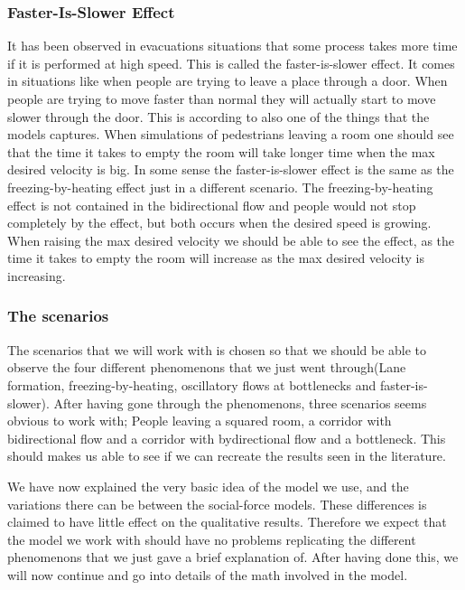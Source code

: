\subsubsection{Faster-Is-Slower Effect}
It has been observed in evacuations situations that some process takes more 
time if it is performed at high speed. This is called the faster-is-slower effect. It comes
in situations like when people are trying to leave a place through a door. When people are
trying to move faster than normal they will actually start to move slower through the door.
This is according to \cite{self-org} also one of the things that the models captures. When simulations
of pedestrians leaving a room one should see that the time it takes to empty the room will take longer time
when the max desired velocity is big. In some sense the faster-is-slower effect is the same as the
freezing-by-heating effect just in a different scenario. The freezing-by-heating effect is not contained
in the bidirectional flow and people would not stop completely by the effect,
but both occurs when the desired speed is growing.
When raising the max desired velocity we should be able to see the effect, as the time it takes to
empty the room will increase as the max desired velocity is increasing.

\subsubsection{The scenarios}
The scenarios that we will work with is chosen so that we should be able to observe the four
different phenomenons that we just went through(Lane formation, freezing-by-heating, oscillatory
flows at bottlenecks and faster-is-slower).
After having gone through the phenomenons, three scenarios seems obvious to work with;
People leaving a squared room, a corridor with bidirectional flow
and a corridor with bydirectional flow and a bottleneck.
This should makes us able to see if we can recreate the results seen in the literature.   

We have now explained the very basic idea of the model we use, and the variations there can be between
the social-force models. These differences is claimed to have little effect on the qualitative results.
Therefore we expect that the model we work with should have no problems replicating the different phenomenons
that we just gave a brief explanation of. After having done this, we will now continue and go into
details of the math involved in the model. 

